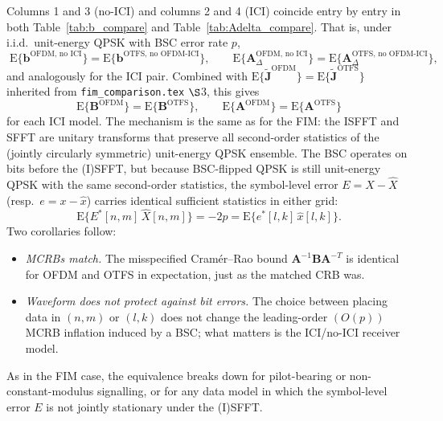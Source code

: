 \documentclass[11pt]{article}
\begin{document}
Columns 1 and 3 (no-ICI) and columns 2 and 4 (ICI) coincide entry by entry in both Table~\ref{tab:b_compare} and Table~\ref{tab:Adelta_compare}. That is, under i.i.d.\ unit-energy QPSK with BSC error rate \(p\),
\begin{equation}
    \boxed{\;
    \mathrm{E}\{\bm{b}^{\text{OFDM, no ICI}}\} = \mathrm{E}\{\bm{b}^{\text{OTFS, no OFDM-ICI}}\},
    \qquad
    \mathrm{E}\{\bm{A}_\Delta^{\text{OFDM, no ICI}}\} = \mathrm{E}\{\bm{A}_\Delta^{\text{OTFS, no OFDM-ICI}}\},
    \;}
\end{equation}
and analogously for the ICI pair. Combined with \(\mathrm{E}\{\tilde{\bm{J}}^{\text{OFDM}}\} = \mathrm{E}\{\tilde{\bm{J}}^{\text{OTFS}}\}\) inherited from \texttt{fim\_comparison.tex} \(\S\)3, this gives
\begin{equation}
    \boxed{\;
    \mathrm{E}\{\bm{B}^{\text{OFDM}}\} = \mathrm{E}\{\bm{B}^{\text{OTFS}}\}, \qquad
    \mathrm{E}\{\bm{A}^{\text{OFDM}}\} = \mathrm{E}\{\bm{A}^{\text{OTFS}}\}
    \;}
\end{equation}
for each ICI model. The mechanism is the same as for the FIM: the ISFFT and SFFT are unitary transforms that preserve all second-order statistics of the (jointly circularly symmetric) unit-energy QPSK ensemble. The BSC operates on bits before the (I)SFFT, but because BSC-flipped QPSK is still unit-energy QPSK with the same second-order statistics, the symbol-level error \(E = X - \hat{X}\) (resp.\ \(e = x - \hat{x}\)) carries identical sufficient statistics in either grid:
\begin{equation}
    \mathrm{E}\{E^*[n,m]\, \hat{X}[n,m]\} = -2p = \mathrm{E}\{e^*[l,k]\, \hat{x}[l,k]\}.
\end{equation}
Two corollaries follow:
\begin{itemize}
    \item \emph{MCRBs match.} The misspecified Cram\'er--Rao bound \(\bm{A}^{-1}\bm{B}\bm{A}^{-T}\) is identical for OFDM and OTFS in expectation, just as the matched CRB was.
    \item \emph{Waveform does not protect against bit errors.} The choice between placing data in \((n,m)\) or \((l,k)\) does not change the leading-order \((O(p))\) MCRB inflation induced by a BSC; what matters is the ICI/no-ICI receiver model.
\end{itemize}
As in the FIM case, the equivalence breaks down for pilot-bearing or non-constant-modulus signalling, or for any data model in which the symbol-level error \(E\) is not jointly stationary under the (I)SFFT.
\end{document}
